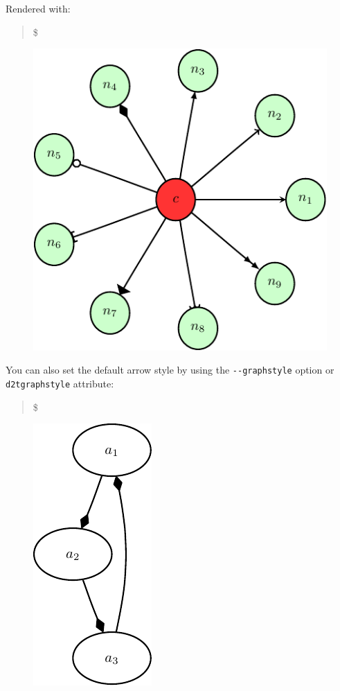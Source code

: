 \documentclass[10pt,a4paper,english]{article}
\begin{document}
Rendered with:
\begin{quote}{\ttfamily \raggedright \noindent
{\$}~
}\end{quote}
\begin{figure}[H]
\centering

\includegraphics{pdf/pgfarrows}
\end{figure}

You can also set the default arrow style by using the \texttt{-{}-graphstyle} option or \texttt{d2tgraphstyle} attribute:
\begin{quote}{\ttfamily \raggedright \noindent
{\$}~
}\end{quote}
\begin{figure}[H]
\centering

\includegraphics{pdf/ex1gstyle}
\end{figure}
\end{document}
